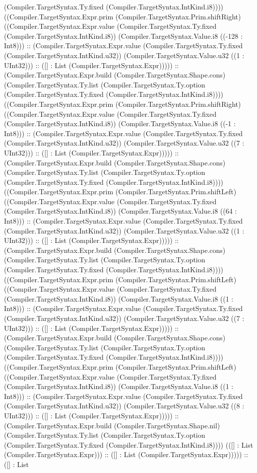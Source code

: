 \documentclass[11pt]{article}
\begin{document}
(Compiler.TargetSyntax.Ty.fixed (Compiler.TargetSyntax.IntKind.i8)))) ((Compiler.TargetSyntax.Expr.prim (Compiler.TargetSyntax.Prim.shiftRight) ((Compiler.TargetSyntax.Expr.value (Compiler.TargetSyntax.Ty.fixed (Compiler.TargetSyntax.IntKind.i8)) (Compiler.TargetSyntax.Value.i8 ((-128 : Int8))) :: (Compiler.TargetSyntax.Expr.value (Compiler.TargetSyntax.Ty.fixed (Compiler.TargetSyntax.IntKind.u32)) (Compiler.TargetSyntax.Value.u32 ((1 : UInt32))) :: ([] : List (Compiler.TargetSyntax.Expr))))) :: (Compiler.TargetSyntax.Expr.build (Compiler.TargetSyntax.Shape.cons) (Compiler.TargetSyntax.Ty.list (Compiler.TargetSyntax.Ty.option (Compiler.TargetSyntax.Ty.fixed (Compiler.TargetSyntax.IntKind.i8)))) ((Compiler.TargetSyntax.Expr.prim (Compiler.TargetSyntax.Prim.shiftRight) ((Compiler.TargetSyntax.Expr.value (Compiler.TargetSyntax.Ty.fixed (Compiler.TargetSyntax.IntKind.i8)) (Compiler.TargetSyntax.Value.i8 ((-1 : Int8))) :: (Compiler.TargetSyntax.Expr.value (Compiler.TargetSyntax.Ty.fixed (Compiler.TargetSyntax.IntKind.u32)) (Compiler.TargetSyntax.Value.u32 ((7 : UInt32))) :: ([] : List (Compiler.TargetSyntax.Expr))))) :: (Compiler.TargetSyntax.Expr.build (Compiler.TargetSyntax.Shape.cons) (Compiler.TargetSyntax.Ty.list (Compiler.TargetSyntax.Ty.option (Compiler.TargetSyntax.Ty.fixed (Compiler.TargetSyntax.IntKind.i8)))) ((Compiler.TargetSyntax.Expr.prim (Compiler.TargetSyntax.Prim.shiftLeft) ((Compiler.TargetSyntax.Expr.value (Compiler.TargetSyntax.Ty.fixed (Compiler.TargetSyntax.IntKind.i8)) (Compiler.TargetSyntax.Value.i8 ((64 : Int8))) :: (Compiler.TargetSyntax.Expr.value (Compiler.TargetSyntax.Ty.fixed (Compiler.TargetSyntax.IntKind.u32)) (Compiler.TargetSyntax.Value.u32 ((1 : UInt32))) :: ([] : List (Compiler.TargetSyntax.Expr))))) :: (Compiler.TargetSyntax.Expr.build (Compiler.TargetSyntax.Shape.cons) (Compiler.TargetSyntax.Ty.list (Compiler.TargetSyntax.Ty.option (Compiler.TargetSyntax.Ty.fixed (Compiler.TargetSyntax.IntKind.i8)))) ((Compiler.TargetSyntax.Expr.prim (Compiler.TargetSyntax.Prim.shiftLeft) ((Compiler.TargetSyntax.Expr.value (Compiler.TargetSyntax.Ty.fixed (Compiler.TargetSyntax.IntKind.i8)) (Compiler.TargetSyntax.Value.i8 ((1 : Int8))) :: (Compiler.TargetSyntax.Expr.value (Compiler.TargetSyntax.Ty.fixed (Compiler.TargetSyntax.IntKind.u32)) (Compiler.TargetSyntax.Value.u32 ((7 : UInt32))) :: ([] : List (Compiler.TargetSyntax.Expr))))) :: (Compiler.TargetSyntax.Expr.build (Compiler.TargetSyntax.Shape.cons) (Compiler.TargetSyntax.Ty.list (Compiler.TargetSyntax.Ty.option (Compiler.TargetSyntax.Ty.fixed (Compiler.TargetSyntax.IntKind.i8)))) ((Compiler.TargetSyntax.Expr.prim (Compiler.TargetSyntax.Prim.shiftLeft) ((Compiler.TargetSyntax.Expr.value (Compiler.TargetSyntax.Ty.fixed (Compiler.TargetSyntax.IntKind.i8)) (Compiler.TargetSyntax.Value.i8 ((1 : Int8))) :: (Compiler.TargetSyntax.Expr.value (Compiler.TargetSyntax.Ty.fixed (Compiler.TargetSyntax.IntKind.u32)) (Compiler.TargetSyntax.Value.u32 ((8 : UInt32))) :: ([] : List (Compiler.TargetSyntax.Expr))))) :: (Compiler.TargetSyntax.Expr.build (Compiler.TargetSyntax.Shape.nil) (Compiler.TargetSyntax.Ty.list (Compiler.TargetSyntax.Ty.option (Compiler.TargetSyntax.Ty.fixed (Compiler.TargetSyntax.IntKind.i8)))) (([] : List (Compiler.TargetSyntax.Expr))) :: ([] : List (Compiler.TargetSyntax.Expr))))) :: ([] : List 
\end{document}
